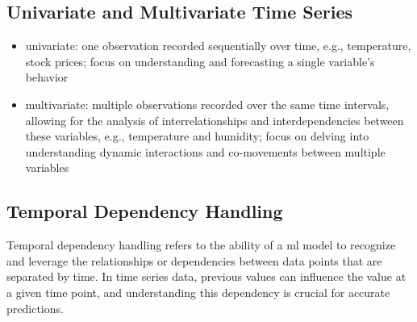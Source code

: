 \subsection{Univariate and Multivariate Time Series}
\begin{itemize}
    \item univariate: one observation recorded sequentially over time, e.g., temperature, stock prices; focus on understanding and forecasting a single variable's behavior
    \item multivariate: multiple observations recorded over the same time intervals, allowing for the analysis of interrelationships and interdependencies between these variables, e.g., temperature and humidity; focus on delving into understanding dynamic interactions and co-movements between multiple variables
\end{itemize}

\subsection{Temporal Dependency Handling}
Temporal dependency handling refers to the ability of a \acs{ml} model to recognize and leverage the relationships or dependencies between data points that are separated by time. 
In time series data, previous values can influence the value at a given time point, and understanding this dependency is crucial for accurate predictions.


